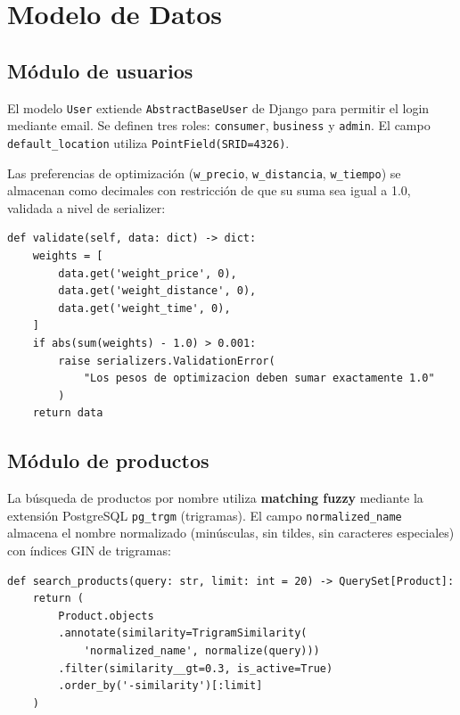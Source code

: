 \section{Modelo de Datos}\label{sec:modelo-datos}

\subsection{M\'odulo de usuarios}\label{subsec:modelo-usuarios}

El modelo \texttt{User} extiende \texttt{AbstractBaseUser} de Django para permitir el login
mediante email. Se definen tres roles: \texttt{consumer}, \texttt{business} y \texttt{admin}.
El campo \texttt{default\_location} utiliza \texttt{PointField(SRID=4326)}.

Las preferencias de optimizaci\'on (\texttt{w\_precio}, \texttt{w\_distancia}, \texttt{w\_tiempo})
se almacenan como decimales con restricci\'on de que su suma sea igual a 1.0, validada a nivel de
serializer:

\begin{verbatim}
def validate(self, data: dict) -> dict:
    weights = [
        data.get('weight_price', 0),
        data.get('weight_distance', 0),
        data.get('weight_time', 0),
    ]
    if abs(sum(weights) - 1.0) > 0.001:
        raise serializers.ValidationError(
            "Los pesos de optimizacion deben sumar exactamente 1.0"
        )
    return data
\end{verbatim}

\subsection{M\'odulo de productos}\label{subsec:modelo-productos}

La b\'usqueda de productos por nombre utiliza \textbf{matching fuzzy} mediante la extensi\'on
PostgreSQL \texttt{pg\_trgm} (trigramas). El campo \texttt{normalized\_name} almacena el nombre
normalizado (min\'usculas, sin tildes, sin caracteres especiales) con \'indices GIN de trigramas:

\begin{verbatim}
def search_products(query: str, limit: int = 20) -> QuerySet[Product]:
    return (
        Product.objects
        .annotate(similarity=TrigramSimilarity(
            'normalized_name', normalize(query)))
        .filter(similarity__gt=0.3, is_active=True)
        .order_by('-similarity')[:limit]
    )
\end{verbatim}

